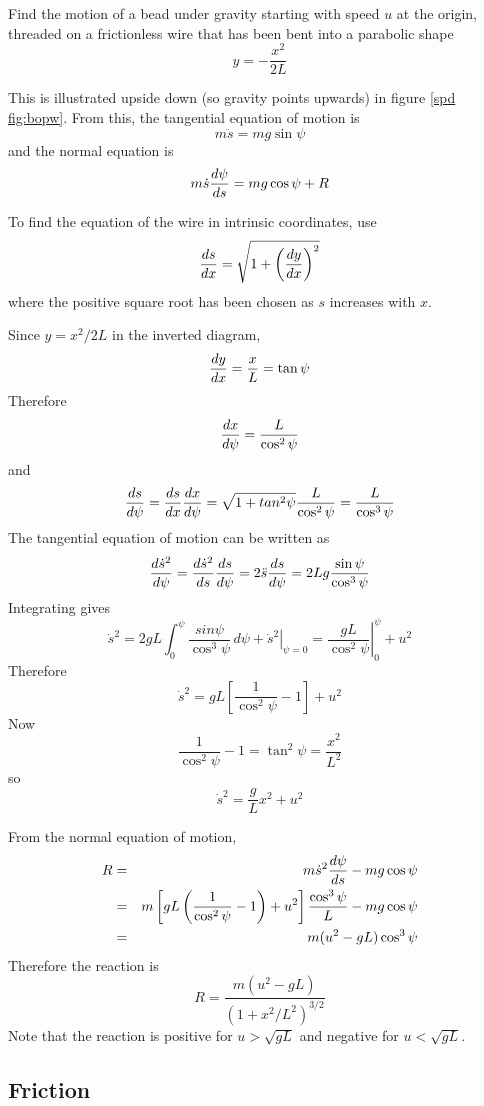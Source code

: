 \begin{example}
\label{spd ex:bopw}
\problem
Find the motion of a bead under gravity starting with speed $u$ at the
origin, threaded on a frictionless wire that has been bent into a
parabolic shape
$$y=-\frac{x^2}{2L}$$

\solution
This is illustrated upside down (so gravity points upwards) in figure
\ref{spd fig:bopw}.  From this, the tangential equation of motion is
$$m\ddot{s}=mg\sin\psi$$
and the normal equation is
$$m\dot{s}\frac{d\psi}{ds}=mg\cos\psi+R$$

To find the equation of the  wire in intrinsic coordinates, use
$$\frac{ds}{dx}=\sqrt{1+\left(\frac{dy}{dx}\right)^2}$$
where the positive square root has been chosen as $s$ increases with $x$.

Since $y=x^2/2L$ in the inverted diagram, 
$$\frac{dy}{dx}=\frac{x}{L}=\tan\psi$$
Therefore
$$\frac{dx}{d\psi}=\frac{L}{\cos^2\psi}$$
and
$$\frac{ds}{d\psi}=\frac{ds}{dx}\frac{dx}{d\psi}=\sqrt{1+tan^2\psi}
\frac{L}{\cos^2\psi}=\frac{L}{\cos^3\psi}$$
The tangential equation of motion can be written as
$$\frac{d\dot{s}^2}{d\psi}=\frac{d\dot{s}^2}{ds}\frac{ds}{d\psi}=
2\ddot{s}\frac{ds}{d\psi}=2Lg\frac{\sin\psi}{\cos^3\psi}$$
Integrating gives
$$\dot{s}^2=2gL\int^{\psi}_0\frac{sin\psi}{\cos^3\psi}\,d\psi
+\left.\dot{s}^2\right|_{\psi=0}
=\left.\frac{gL}{\cos^2\psi}\right|_0^{\psi}+u^2$$
Therefore
$$\dot{s}^2=gL\left[\frac{1}{\cos^2\psi}-1\right]+u^2$$
Now 
$$\frac{1}{\cos^2\psi}-1=\tan^2\psi=\frac{x^2}{L^2}$$
so
$$\dot{s}^2=\frac{g}{L}x^2+u^2$$

From the normal equation of motion, 
\begin{eqnarray*}
R&=&m\dot{s}^2\frac{d\psi}{ds}-mg\cos\psi \\
&=&m\left[gL\left(\frac{1}{\cos^2\psi}-1\right)+u^2\right]
\frac{\cos^3\psi}{L}-mg\cos\psi \\
&=&m(u^2-gL)\cos^3\psi
\end{eqnarray*}
Therefore the reaction is
$$R=\frac{m(u^2-gL)}{\left(1+x^2/L^2\right)^{3/2}}$$
Note that the reaction is positive for $u>\sqrt{gL}$ and negative for
$u<\sqrt{gL}$.
\end{example}

\subsection{Friction}

